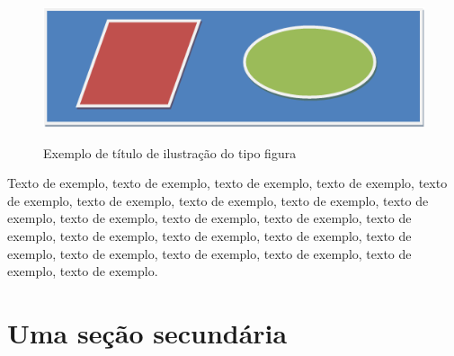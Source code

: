 \documentclass[
	12pt,				%
	oneside,			%
	a4paper,			%
	english,			%
	brazil				%
	]{abntex2ppgsi}
\begin{document}
% 
%
%
%
%
\begin{figure}[H]%
	\centering
 	  \caption{Exemplo de título de ilustração do tipo figura}
		\includegraphics{figura-exemplo.png}
	\label{fig:figura-exemplo1}
\end{figure}

Texto de exemplo, texto de exemplo, texto de exemplo, texto de exemplo, texto de exemplo, texto de exemplo, texto de exemplo, texto de exemplo, texto de exemplo, texto de exemplo, texto de exemplo, texto de exemplo, texto de exemplo, texto de exemplo, texto de exemplo, texto de exemplo, texto de exemplo, texto de exemplo, texto de exemplo, texto de exemplo, texto de exemplo, texto de exemplo.

\section{Uma seção secundária}
 
\end{document}
